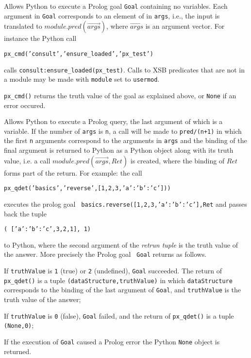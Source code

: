 \begin{description}

%
  Allows Python to execute a Prolog goal {\tt Goal} containing no
  variables.  Each argument in {\tt Goal} corresponds to an element of
  in {\tt args}, i.e., the input is translated to
  $module.pred(\vec{args})$, where $\vec{args}$ is an argument vector.
  For instance the Python call

  {\tt px\_cmd('consult','ensure\_loaded','px\_test')}

  calls {\tt consult:ensure\_loaded(px\_test)}.  Calls to XSB
  predicates that are not in a module may be made with {\tt module}
  set to {\tt usermod}.

  {\tt px\_cmd()} returns the truth value of the goal as explained
  above, or {\tt None} if an error occured.
  
%
  Allows Python to execute a Prolog query, the last argument of which
  is a variable.  If the number of {\tt args} is {\tt n}, a call will
  be made to {\tt pred/(n+1)} in which the first {\tt n} arguments
  correspond to the arguments in {\tt args} and the binding of the
  final argument is returned to Python as a Python object along with
  its truth value, i.e. a call $module.pred(\vec{args},Ret)$ is
  created, where the binding of $Ret$ forms part of the return.  For
  example: the call

  {\tt px\_qdet('basics','reverse',[1,2,3,{'a':{'b':'c'}}]))}

  \noindent
  executes the prolog goal {\tt
    basics.reverse([1,2,3,{'a':{'b':'c'}}],Ret} and passes back the tuple

  {\tt ( [{'a':{'b':'c'}},3,2,1], 1)}

  \noindent
  to Python, where the second argument of the {\em retrun tuple} is
  the truth value of the answer.  More precisely the Prolog goal {\tt
    Goal} returns as follows.

  \bi
  \item If {\tt truthValue} is {\tt 1} (true) or {\tt 2} (undefined),
    {\tt Goal} succeeded.  The return of {\tt px\_qdet()} is a tuple
    {\tt (dataStructure,truthValue)} in which {\tt dataStructure}
    corresponds to the binding of the last argument of {\tt Goal}, and
    {\tt truthValue} is the truth value of the answer;
   \item If {\tt truthValue} is {\tt 0} (false), {\tt Goal} failed,
     and the return of {\tt px\_qdet()} is a tuple {\tt (None,0)};
   \item If the execution of {\tt Goal} caused a Prolog error the
     Python {\tt None} object is returned.
     \ei


\end{description}
